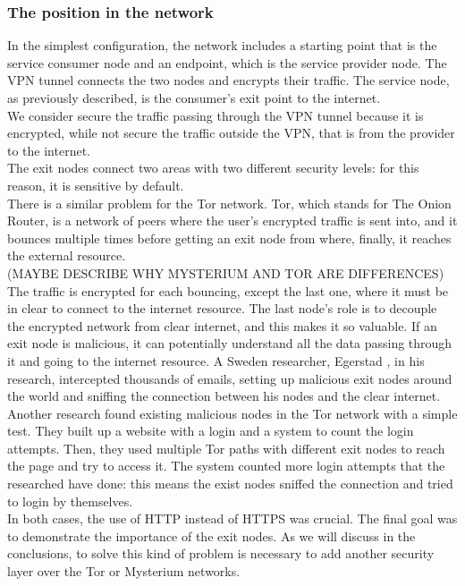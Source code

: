 \documentclass[]{article}
\begin{document}
	\subsubsection{The position in the network}

	In the simplest configuration, the network includes a starting point that is the service consumer node and an endpoint, which is the service provider node. The VPN tunnel connects the two nodes and encrypts their traffic. The service node, as previously described, is the consumer's exit point to the internet.\\
	We consider secure the traffic passing through the VPN tunnel because it is encrypted, while not secure the traffic outside the VPN, that is from the provider to the internet.\\
	The exit nodes connect two areas with two different security levels: for this reason, it is sensitive by default.\\
	There is a similar problem for the Tor network. Tor, which stands for The Onion Router, is a network of peers where the user's encrypted traffic is sent into, and it bounces multiple times before getting an exit node from where, finally, it reaches the external resource.\\
	(MAYBE DESCRIBE WHY MYSTERIUM AND TOR ARE DIFFERENCES)
	The traffic is encrypted for each bouncing, except the last one, where it must be in clear to connect to the internet resource. The last node's role is to decouple the encrypted network from clear internet, and this makes it so valuable. If an exit node is malicious, it can potentially understand all the data passing through it and going to the internet resource. A Sweden researcher, Egerstad \cite{exitnodeTOR}, in his research, intercepted thousands of emails, setting up malicious exit nodes around the world and sniffing the connection between his nodes and the clear internet.\\
	Another research found existing malicious nodes in the Tor network with a simple test. They built up a website with a login and a system to count the login attempts. Then, they used multiple Tor paths with different exit nodes to reach the page and try to access it. The system counted more login attempts that the researched have done: this means the exist nodes sniffed the connection and tried to login by themselves.\\
	
	In both cases, the use of HTTP instead of HTTPS was crucial. The final goal was to demonstrate the importance of the exit nodes. As we will discuss in the conclusions, to solve this kind of problem is necessary to add another security layer over the Tor or Mysterium networks.  
\end{document}
